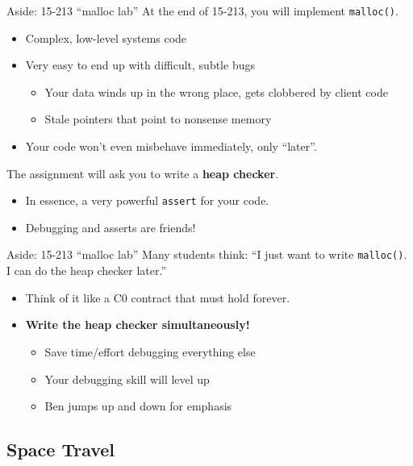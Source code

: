 \documentclass[xcolor=dvipsnames]{beamer}
\begin{document}
\begin{frame}{Aside: 15-213 ``malloc lab''}
	At the end of 15-213, you will implement \texttt{malloc()}.
	\begin{itemize}
		\item Complex, low-level systems code
		\item Very easy to end up with difficult, subtle bugs
		\begin{itemize}
			\item Your data winds up in the wrong place, gets clobbered by client code
			\item Stale pointers that point to nonsense memory
		\end{itemize}
		\item Your code won't even misbehave immediately, only ``later''.
	\end{itemize}
	\pause
	\linegap

	The assignment will ask you to write a {\bf heap checker}.
	\begin{itemize}
		\item In essence, a very powerful \texttt{assert} for your code.
		\item Debugging and asserts are friends!
	\end{itemize}
\end{frame}

\begin{frame}{Aside: 15-213 ``malloc lab''}
	Many students think: ``I just want to write \texttt{malloc()}. I can do the heap checker later.''
	\pause
	\begin{itemize}
		\item Think of it like a C0 contract that must hold forever.
		\item \textbf{Write the heap checker simultaneously!}
			\pause
			\begin{itemize}
				\item Save time/effort debugging everything else
				\item Your debugging skill will level up
				\item Ben jumps up and down for emphasis
			\end{itemize}
	\end{itemize}
\end{frame}

\subsection{Space Travel}

\end{document}
